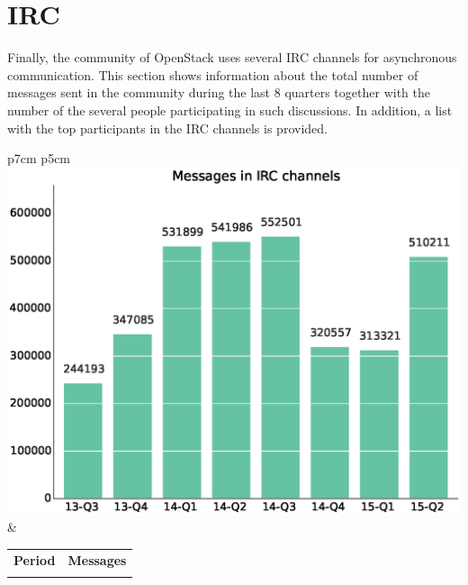 \documentclass[a4wide,11pt]{report}
\begin{document}
\section{IRC}

Finally, the community of OpenStack uses several IRC channels for asynchronous communication. 
This section shows information about the total number of messages sent in the community during 
the last 8 quarters together with the number of the several people participating in such discussions.
In addition, a list with the top participants in the IRC channels is provided.

\begin{tabular}{p{7cm} p{5cm}}
    \vspace{0pt} 
    \includegraphics[scale=.35]{figs/irc_sent.eps}
    & 
    \vspace{0pt}
    \begin{tabular}{l|l}%
    \bfseries Period & \bfseries Messages %
    \csvreader[head to column names]{data/irc_sent.csv}{}%
    {\\ & \messages}
    \end{tabular}
\end{tabular}
\end{document}
